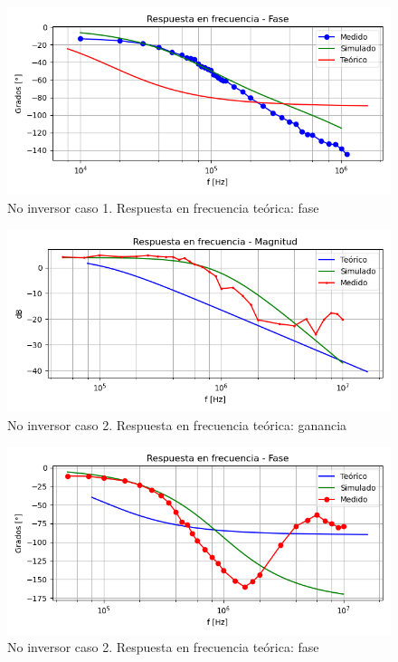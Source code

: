 \begin{figure}[H]
	\centering
		\includegraphics[width=.8\linewidth]{./Imagenes/NoInvCaso1Phase.png}  
		\caption{No inversor caso 1. Respuesta en frecuencia teórica: fase}
	\label{fig:circinvcaso1}
\end{figure}

\begin{figure}[H]
	\centering
		\includegraphics[width=.8\linewidth]{./Imagenes/NoInvCaso2Gain.png}  
		\caption{No inversor caso 2. Respuesta en frecuencia teórica: ganancia}
	\label{fig:circinvcaso1}
\end{figure}

\begin{figure}[H]
	\centering
		\includegraphics[width=.8\linewidth]{./Imagenes/NoInvCaso2Phase.png}  
		\caption{No inversor caso 2. Respuesta en frecuencia teórica: fase}
	\label{fig:circinvcaso1}
\end{figure}

